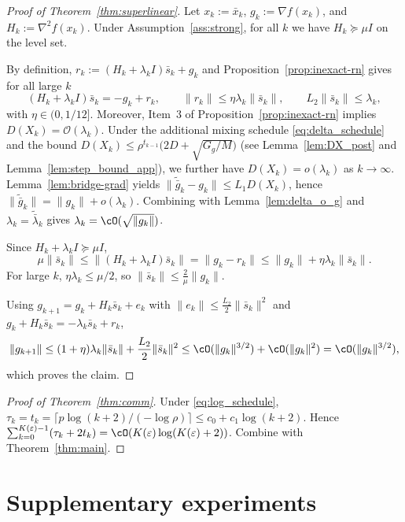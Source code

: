\documentclass[review,onefignum,onetabnum]{siamart171218}
\begin{document}
\begin{proof}[Proof of Theorem~\ref{thm:superlinear}]
Let $x_k:=\bar x_k$, $g_k:=\nabla f(x_k)$, and $H_k:=\nabla^2 f(x_k)$.
Under Assumption~\ref{ass:strong}, for all $k$ we have $H_k\succeq \mu I$ on the level set.

By definition, $r_k:=(H_k+\lambda_k I)\bar s_k+g_k$ and Proposition~\ref{prop:inexact-rn} gives for all large $k$
\[
(H_k+\lambda_k I)\bar s_k=-g_k+r_k,\qquad \|r_k\|\le \eta\lambda_k\|\bar s_k\|,\qquad L_2\|\bar s_k\|\le \lambda_k,
\]
with $\eta\in(0,1/12]$. Moreover, Item~3 of Proposition~\ref{prop:inexact-rn} implies $D(X_k)=\mathcal O(\lambda_k)$.
Under the additional mixing schedule \eqref{eq:delta_schedule} and the bound
$D(X_k)\le \rho^{t_{k-1}}\big(2D+\sqrt{G_g/M}\big)$ (see Lemma~\ref{lem:DX_post} and Lemma~\ref{lem:step_bound_app}),
we further have $D(X_k)=o(\lambda_k)$ as $k\to\infty$.
Lemma~\ref{lem:bridge-grad} yields
$\|\tilde{\bar g}_k-g_k\|\le L_1D(X_k)$, hence $\|\tilde{\bar g}_k\|=\|g_k\|+o(\lambda_k)$.
Combining with Lemma~\ref{lem:delta_o_g} and $\lambda_k=\tilde{\bar\lambda}_k$ gives $\lambda_k=\cO(\sqrt{\|g_k\|})$.

Since $H_k+\lambda_k I\succeq \mu I$,
\[
\mu\|\bar s_k\|\le \|(H_k+\lambda_k I)\bar s_k\|=\|g_k-r_k\|\le \|g_k\|+\eta\lambda_k\|\bar s_k\|.
\]
For large $k$, $\eta\lambda_k\le \mu/2$, so $\|\bar s_k\|\le \frac{2}{\mu}\|g_k\|$.

Using $g_{k+1}=g_k+H_k\bar s_k+e_k$ with $\|e_k\|\le \frac{L_2}{2}\|\bar s_k\|^2$ and $g_k+H_k\bar s_k=-\lambda_k\bar s_k+r_k$,
\[
\|g_{k+1}\|\le (1+\eta)\lambda_k\|\bar s_k\|+\frac{L_2}{2}\|\bar s_k\|^2
\le \cO(\|g_k\|^{3/2})+\cO(\|g_k\|^2)=\cO(\|g_k\|^{3/2}),
\]
which proves the claim.
\end{proof}



\begin{proof}[Proof of Theorem~\ref{thm:comm}]
Under \eqref{eq:log_schedule}, $\tau_k=t_k=\lceil p\log(k+2)/(-\log\rho)\rceil\le c_0+c_1\log(k+2)$.
Hence $\sum_{k=0}^{K(\varepsilon)-1}(\tau_k+2t_k)=\cO(K(\varepsilon)\log(K(\varepsilon)+2))$.
Combine with Theorem~\ref{thm:main}.
\end{proof}

\section{Supplementary experiments}\label{app:supp_exp}
\end{document}
